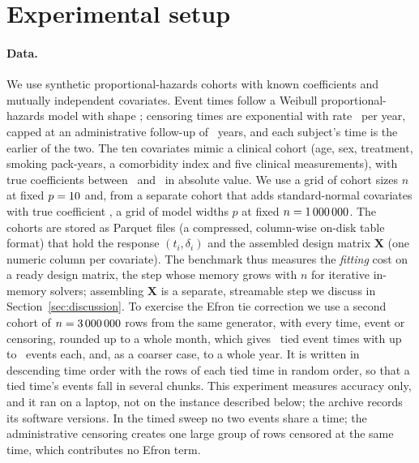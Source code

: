\documentclass[11pt,a4paper]{article}
\begin{document}
\section{Experimental setup}
\label{sec:setup}

\paragraph{Data.} We use synthetic proportional-hazards cohorts with known
coefficients and mutually independent covariates. Event times follow a Weibull
proportional-hazards model with shape \DGPShape; censoring times are
exponential with rate \DGPCensRate\ per year, capped at an administrative
follow-up of \DGPFollowUp\ years, and each subject's time is the earlier of the
two. The ten covariates mimic a clinical cohort (age, sex, treatment, smoking
pack-years, a comorbidity index and five clinical measurements),
with true coefficients between \DGPCoefMin\ and \DGPCoefMax\ in absolute value.
We use a grid of cohort sizes $n$ at fixed $p=10$ and, from a
separate cohort that adds standard-normal covariates with true coefficient
\DGPExtraCoef, a grid of model widths $p$ at fixed $n = 1\,000\,000$. The
cohorts are stored as Parquet files (a compressed, column-wise on-disk table
format) that hold the response $(t_i, \delta_i)$ and the assembled design
matrix $\mathbf{X}$ (one numeric column per covariate). The benchmark thus
measures the \emph{fitting} cost on a
ready design matrix, the step whose memory grows with $n$ for iterative
in-memory solvers; assembling $\mathbf{X}$ is a separate, streamable step we
discuss in Section~\ref{sec:discussion}. To exercise the Efron tie correction we
use a second cohort of $n = 3\,000\,000$ rows from the same generator, with every
time, event or censoring, rounded up to a whole month, which gives
\TiesNTieGroups\ tied event times with up to \TiesMaxGroupEvents\ events each,
and, as a coarser case, to a whole year. It is written in descending time
order with the rows of each tied time in random order, so that a tied time's
events fall in several chunks. This experiment measures accuracy only, and it
ran on a laptop, not on the instance described below; the archive records its
software versions. In the
timed sweep no two events share a time; the administrative censoring creates
one large group of rows censored at the same time, which contributes no Efron
term.
\end{document}
